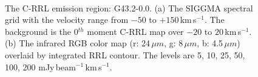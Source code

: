 \documentclass[manuscript]{aastex61}
\newcommand{\kms}{\,km\,s$^{-1}$}
\newcommand{\um}{\mu m}
\begin{document}
\begin{figure}[H]
	\centering
	\\ 
	\caption{The C-RRL emission region: G43.2-0.0.
	(a) The SIGGMA spectral grid with the velocity range from $-50$ to $+150$\kms.
	The background is the 0$^{th}$ moment C-RRL map over $-20$ to $20$\kms.
	(b) The infrared RGB color map (r: 24\,$\um$, g: 8\,$\um$, b: 4.5\,$\um$) overlaid by integrated RRL contour.
	The levels are 5, 10, 25, 50, 100, 200 mJy\,beam$^{-1}$\kms.}
	\label{fig_crrl-g432}
\end{figure}
\end{document}
